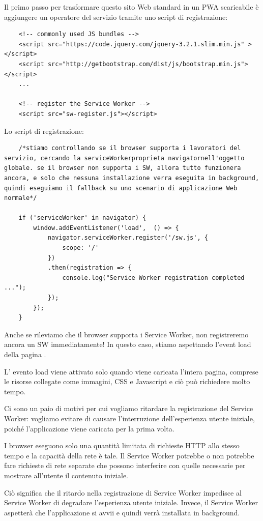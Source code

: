 \documentclass[italian]{article}
\begin{document}
Il primo passo per trasformare questo sito Web standard in un PWA scaricabile è aggiungere un operatore del servizio tramite uno script di registrazione:
\begin{lstlisting}
	<!-- commonly used JS bundles -->
	<script src="https://code.jquery.com/jquery-3.2.1.slim.min.js" ></script>
	<script src="http://getbootstrap.com/dist/js/bootstrap.min.js"></script>
	...
	
	<!-- register the Service Worker -->
	<script src="sw-register.js"></script>
\end{lstlisting}
Lo script di registrazione:
\begin{lstlisting}
	/*stiamo controllando se il browser supporta i lavoratori del servizio, cercando la serviceWorkerproprieta navigatornell'oggetto globale. se il browser non supporta i SW, allora tutto funzionera ancora, e solo che nessuna installazione verra eseguita in background, quindi eseguiamo il fallback su uno scenario di applicazione Web normale*/

	if ('serviceWorker' in navigator) {
		window.addEventListener('load',  () => {
			navigator.serviceWorker.register('/sw.js', {
				scope: '/'
			})
			.then(registration => {
				console.log("Service Worker registration completed ...");
			});
		});
	}
\end{lstlisting}

Anche se rileviamo che il browser supporta i Service Worker, non registreremo ancora un SW immediatamente! In questo caso, stiamo aspettando l'event load della pagina .

L' evento load viene attivato solo quando viene caricata l'intera pagina, comprese le risorse collegate come immagini, CSS e Javascript e ciò può richiedere molto tempo.

Ci sono un paio di motivi per cui vogliamo ritardare la registrazione del Service Worker: vogliamo evitare di causare l'interruzione dell'esperienza utente iniziale, poiché l'applicazione viene caricata per la prima volta.

I browser eseguono solo una quantità limitata di richieste HTTP allo stesso tempo e la capacità della rete è tale. Il Service Worker potrebbe o non potrebbe fare richieste di rete separate che possono interferire con quelle necessarie per mostrare all'utente il contenuto iniziale.

Ciò significa che il ritardo nella registrazione di Service Worker impedisce al Service Worker di degradare l'esperienza utente iniziale. Invece, il Service Worker aspetterà che l'applicazione si avvii e quindi verrà installata in background.
\end{document}
